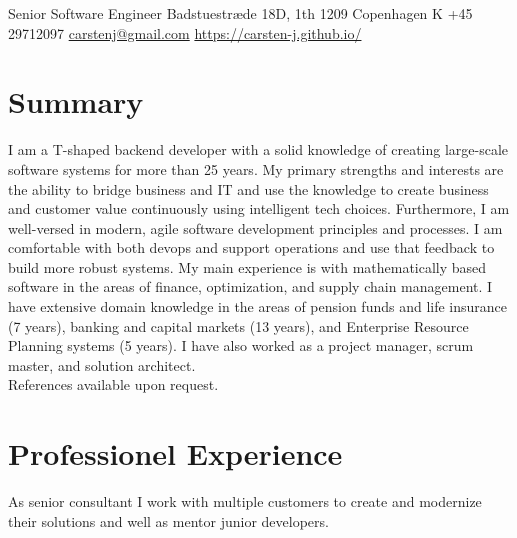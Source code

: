 \documentclass[10pt, a4paper]{article}
\begin{document}
{Senior Software Engineer}
{Badstuestræde 18D, 1th}
{1209 Copenhagen K}
{+45 29712097}
{\href{mailto:carstenj@gmail.com}{carstenj@gmail.com}}
{\href{https://carsten-j.github.io/}{https://carsten-j.github.io/}}

\section{Summary}
I am a T-shaped backend developer with a solid knowledge of creating large-scale software systems for more than 25 years. My primary strengths and interests are the ability to bridge business and IT and use the knowledge to create business and customer value continuously using intelligent tech choices. Furthermore, I am well-versed in modern, agile software development principles and processes. I am comfortable with both devops and support operations and use that feedback to build more robust systems. My main experience is with mathematically based software in the areas of finance, optimization, and supply chain management. I have extensive domain knowledge in the areas of pension funds and life insurance (7 years), banking and capital markets (13 years), and Enterprise Resource Planning systems (5 years). I have also worked as a project manager, scrum master, and solution architect.\\[0.2cm]
References available upon request.

\section{Professionel Experience}

{As senior consultant I work with multiple customers to create and modernize their solutions and well as mentor junior developers.}
{
}
\end{document}
